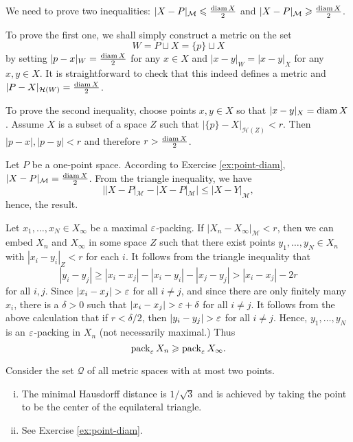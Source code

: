 
We need to prove two inequalities: $|X-P|_{\mathcal{M}} \leqslant \tfrac{\operatorname{diam} X}2$ and $|X-P|_{\mathcal{M}} \geqslant \tfrac{\operatorname{diam} X}2$.

To prove the first one, we shall simply construct a metric on the set 
$$W=P\sqcup X=\{p\}\sqcup X$$ 
by setting $|p-x|_W=\tfrac{\operatorname{diam} X}2$ for any $x\in X$ and $|x-y|_W=|x-y|_X$ for any $x,y\in X$.
It is straightforward to check that this indeed defines a metric and $|P-X|_{\mathcal{H}(W)}= \tfrac{\operatorname{diam} X}2$.

To prove the second inequality, choose points $x,y\in X$ so that $|x-y|_X= \operatorname{diam} X$.
Assume $X$ is a subset of a space $Z$ such that $|\{p\}-X|_{\mathcal{H}(Z)}<r$.
Then $|p-x|,|p-y|<r$ and therefore $r>\tfrac{\operatorname{diam} X}2$.


 Let $P$ be a one-point space.
According to Exercise \ref{ex:point-diam}, $|X-P|_{\mathcal{M}} = \tfrac{\operatorname{diam} X}2$.
From the triangle inequality,%
 we have
$$||X-P|_{\mathcal{M}}-|X-P|_{\mathcal{M}}|\le |X-Y|_{\mathcal{M}},$$
hence, the result.


 Let $x_1, \ldots , x_N \in X_\infty$ be a maximal $\varepsilon$-packing.  If $|X_n-X_\infty|_{\mathcal{M}} < r$, then we can embed $X_n$ and $X_\infty$ in some space $Z$ such that there exist points $y_1, \ldots , y_N \in X_n$ with $|x_i - y_i|_Z < r$ for each $i$.  It follows from the triangle inequality that
$$|y_i - y_j| \ge |x_i - x_j| - |x_i - y_i| - |x_j - y_j| > |x_i - x_j| - 2r$$ for all $i,j$.  Since $|x_i - x_j| > \varepsilon$ for all $i \neq j$, and since there are only finitely many $x_i$, there is a $\delta > 0$ such that $|x_i - x_j| > \varepsilon + \delta$ for all $i \neq j$.  It follows from the above calculation that if $r < \delta / 2$, then $|y_i - y_j| > \varepsilon$ for all $i \neq j$.  Hence, $y_1, \ldots , y_N$ is an $\varepsilon$-packing in $X_n$ (not necessarily maximal.)  Thus
$$ \operatorname{pack}_\varepsilon X_n \geqslant \operatorname{pack}_\varepsilon X_\infty. $$


Consider the set $\mathcal{Q}$ of all metric spaces with at most two points.

\begin{enumerate}[(i)]
\item The minimal Hausdorff distance is $1/\sqrt{3}$ and is achieved by taking the point to be the center of the equilateral triangle.
\item See Exercise \ref{ex:point-diam}.
\end{enumerate}


